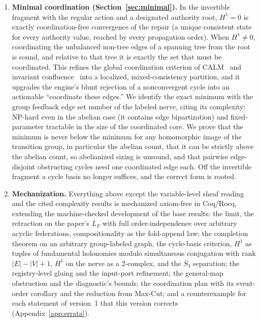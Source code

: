\documentclass[11pt,a4paper]{article}
\theoremstyle{plain}
\theoremstyle{definition}
\theoremstyle{remark}
\newcommand{\Ho}{H^1}
\renewcommand{\_}{\origunderscore\allowbreak}
\begin{document}
\begin{enumerate}[leftmargin=*]
  (possibly non-invertible) cycle, a global consistent state exists iff the cycle's loop composite has
  a fixed point, iff some seed reaches one under iteration; restriction to one vertex identifies the
  sections with the fixed points, so the test runs over the shared subspace rather than the product.
  The reference engine implements it as a cycle diagnostic that names the cycle and reports whether
  one seed settles or orbits. A settling seed proves a section exists; an orbiting seed is definitive
  only when the action is free (the regular action of the invertible fragment).
\item \textbf{Minimal coordination (Section~\ref{sec:minimal}).} In the invertible fragment with the
  regular action and a designated authority root, $\Ho = 0$ is exactly coordination-free convergence
  of the repair (a unique consistent state for every authority value, reached by every propagation
  order). When $\Ho \neq 0$, coordinating the unbalanced non-tree edges of a spanning tree from the
  root is sound, and relative to that tree it is exactly the set that must be coordinated. This
  refines the global coordination criterion of
  CALM~\cite{hellerstein2010declarative,ameloot2013relational} and invariant
  confluence~\cite{bailis2014coordination} into a localized, mixed-consistency partition, and it
  upgrades the engine's blunt rejection of a nonconvergent cycle into an actionable ``coordinate
  these edges.'' We identify the exact minimum with the group feedback edge set number of the
  labeled nerve, citing its complexity: NP-hard even in the abelian case (it contains edge
  bipartization) and fixed-parameter tractable in the size of the coordinated core. We prove that the
  minimum is never below the minimum for any homomorphic image of the transition group, in
  particular the abelian count, that it can be strictly above the abelian count, so abelianized sizing
  is unsound, and that pairwise edge-disjoint obstructing cycles need one coordinated edge each. Off the
  invertible fragment a cycle basis no longer suffices, and the correct form is rooted.
\item \textbf{Mechanization.} Everything above except the variable-level sheaf reading and the cited
  complexity results is mechanized axiom-free in Coq/Rocq, extending the machine-checked development of the
  base results: the limit, the retraction on the paper's $L_F$ with full order-independence over
  arbitrary acyclic federations, compositionality as the fold-append law; the completion theorem on an arbitrary
  group-labeled graph, the cycle-basis criterion, $\Ho$ as tuples of fundamental holonomies modulo
  simultaneous conjugation with rank $|E| - |V| + 1$, $\Ho$ on the nerve as a 2-complex, and the
  $S_3$ separation; the registry-level gluing and the input-port refinement; the general-map
  obstruction and the diagnostic's bounds; the coordination plan with its event-order corollary and
  the reduction from Max-Cut; and
  a counterexample for each statement of version~1 that this version corrects
  (Appendix~\ref{app:errata}).
\end{enumerate}
\end{document}
